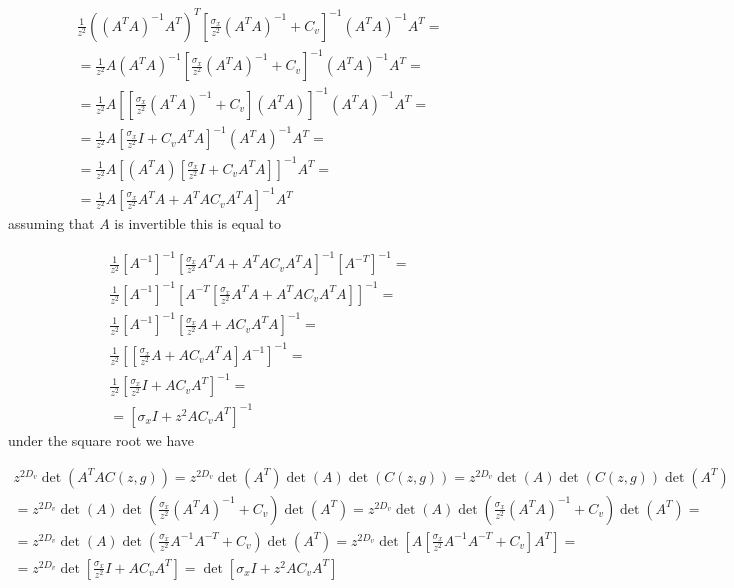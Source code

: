 \documentclass{paper}
\begin{document}
\begin{equation}
\begin{split}
\frac{1}{z^2} \left( (A^TA)^{-1}A^T \right)^T \left[  \frac{\sigma_x}{z^2} (A^TA)^{-1} + C_v  \right]^{-1} (A^TA)^{-1}A^T = \\
= \frac{1}{z^2} A (A^TA)^{-1} \left[  \frac{\sigma_x}{z^2} (A^TA)^{-1} + C_v  \right]^{-1} (A^TA)^{-1}A^T = \\
= \frac{1}{z^2} A \left[ \left[ \frac{\sigma_x}{z^2} (A^TA)^{-1} + C_v \right] (A^TA) \right]^{-1} (A^TA)^{-1}A^T = \\
= \frac{1}{z^2} A \left[ \frac{\sigma_x}{z^2} I + C_v A^TA \right]^{-1} (A^TA)^{-1}A^T = \\
= \frac{1}{z^2} A \left[ (A^TA) \left[ \frac{\sigma_x}{z^2} I + C_v A^TA \right] \right]^{-1} A^T = \\
= \frac{1}{z^2} A  \left[ \frac{\sigma_x}{z^2} A^TA + A^TA C_v A^TA \right]^{-1} A^T
\end{split}
\end{equation}
%
assuming that $A$ is invertible this is equal to

\begin{equation}
\begin{split}
\frac{1}{z^2} \left[ A^{-1}\right]^{-1}  \left[ \frac{\sigma_x}{z^2} A^TA + A^TA C_v A^TA \right]^{-1} \left[ A^{-T}\right]^{-1} = \\
\frac{1}{z^2} \left[ A^{-1}\right]^{-1}  \left[ A^{-T} \left[ \frac{\sigma_x}{z^2} A^TA + A^TA C_v A^TA \right] \right]^{-1} = \\
\frac{1}{z^2} \left[ A^{-1}\right]^{-1}  \left[ \frac{\sigma_x}{z^2} A + A C_v A^TA \right]^{-1} = \\
\frac{1}{z^2} \left[  \left[ \frac{\sigma_x}{z^2} A + A C_v A^TA\right] A^{-1} \right]^{-1} = \\
\frac{1}{z^2} \left[ \frac{\sigma_x}{z^2} I + A C_v A^T\right]^{-1} = \\
= \left[ \sigma_x I + z^2 A C_v A^T \right]^{-1}
\end{split}
\end{equation}
%
under the square root we have

\begin{equation}
\begin{split}
z^{2 D_v} \det(A^TA C(z,g)) = z^{2 D_v} \det(A^T) \det(A) \det(C(z,g)) = z^{2 D_v} \det(A) \det(C(z,g)) \det(A^T)\\
= z^{2 D_v} \det(A) \det(\frac{\sigma_x}{z^2} (A^TA)^{-1} + C_v) \det(A^T) = 
z^{2 D_v} \det(A) \det(\frac{\sigma_x}{z^2} (A^TA)^{-1} + C_v) \det(A^T) = \\
= z^{2 D_v} \det(A) \det(\frac{\sigma_x}{z^2} A^{-1}A^{-T} + C_v) \det(A^T) = 
z^{2 D_v} \det \left[ A \left[ \frac{\sigma_x}{z^2} A^{-1}A^{-T} + C_v \right] A^T \right] = \\
= z^{2 D_v} \det \left[  \frac{\sigma_x}{z^2} I + A C_v A^T \right] =
\det \left[  \sigma_x I + z^2 A C_v A^T \right]
\end{split}
\end{equation}
\end{document}
